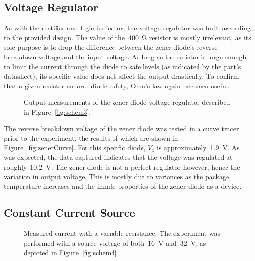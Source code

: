 \subsection{Voltage Regulator}
As with the rectifier and logic indicator, the voltage regulator was built
according to the provided design.  The value of the~\SI{400}{\ohm} resistor is
mostly irrelevant, as its sole purpose is to drop the difference between the
zener diode's reverse breakdown voltage and the input voltage.  As long as the
resistor is large enough to limit the current through the diode to safe levels
(as indicated by the part's datasheet), its specific value does not affect the
output drastically.  To confirm that a given resistor ensures diode safety,
Ohm's law again becomes useful.
%
\begin{figure}[H]
	\centering
	
	\caption{Output measurements of the zener diode voltage
		regulator described in Figure~\ref{fig:schem3}.}
	\label{tab:ckt3data}
\end{figure}
%
The reverse breakdown voltage of the zener diode was tested in a curve tracer
prior to the experiment, the results of which are shown in
Figure~\ref{fig:zenerCurve}.  For this specific diode, $V_z$ is
approximately~\SI{1.9}{\volt}.  As was expected, the data captured indicates
that the voltage was regulated at roughly~\SI{10.2}{\volt}.  The zener diode is
not a perfect regulator however, hence the variation in output voltage.  This
is mostly due to variances as the package temperature increases and the innate
properties of the zener diode as a device.

\subsection{Constant Current Source}
\begin{figure}[H]
	\centering
	
	\caption{Measured current with a variable resistance.  The experiment was
		performed with a source voltage of both~\SI{16}{\volt}
		and~\SI{32}{\volt}, as depicted in Figure~\ref{fig:schem4}}
	\label{tab:ckt4data}
\end{figure}
